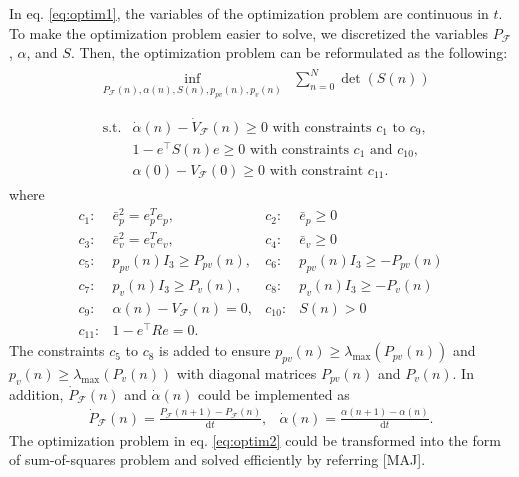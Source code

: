 \documentclass[letterpaper, 10 pt, conference]{ieeeconf}  %
\begin{document}
In eq. \eqref{eq:optim1}, the variables of the optimization problem are continuous in $t$. 
To make the optimization problem easier to solve, 
we discretized the variables $P_\mathcal{F}$, $\alpha$, and $S$. 
Then, the optimization problem can be reformulated as the following:
\begin{align}
&
\begin{array}{rl}
\displaystyle{\inf_{P_\mathcal{F}(n),\alpha(n),S(n),p_{pv}(n),p_v(n)}} & \displaystyle{\sum_{n=0}^{N}} \det(S(n))  \\
\end{array} \label{eq:optim2} \\
&
\begin{array}{rl}
\displaystyle{\text{s.t.}}& \dot{\alpha}(n) - \dot{V}_\mathcal{F}(n) \geq 0\text{ with constraints $c_1$ to $c_9$},  \\
& 1-e^\intercal S(n) e \geq 0\text{ with constraints $c_1$ and $c_{10}$}, \nonumber \\
& \alpha(0) - V_\mathcal{F}(0) \geq 0\text{ with constraint $c_{11}$}. \nonumber
\end{array} \nonumber 
\end{align}
where
\begin{equation}
\begin{array}{rlrl}
c_1:& \bar{e}_p^2 = e_p^Te_p,           & c_2:&\bar{e}_p \geq 0 \\
c_3:& \bar{e}_v^2 = e_v^Te_v,           & c_4:&\bar{e}_v \geq 0 \\
c_5:& p_{pv}(n)I_3 \geq P_{pv}(n),      & c_6:&p_{pv}(n)I_3 \geq -P_{pv}(n) \\
c_7:& p_{ v}(n)I_3 \geq P_{ v}(n),      & c_8:&p_{ v}(n)I_3 \geq -P_{ v}(n) \\
c_9:& \alpha(n) - V_\mathcal{F}(n) = 0, & c_{10}:&S(n) > 0 \\
c_{11}:& 1-e^\intercal R e = 0. &&
\end{array} \nonumber
\end{equation}
The constraints $c_5$ to $c_8$ is added to ensure $p_{pv}(n) \geq \lambda_{\max}(P_{pv}(n))$ and $p_v(n) \geq \lambda_{\max}(P_v(n))$ with diagonal matrices $P_{pv}(n)$ and $P_v(n)$.
In addition, $\dot{P}_\mathcal{F}(n)$ and $\dot{\alpha}(n)$ could be implemented as
\begin{equation}
\begin{array}{cc}
\dot{P}_\mathcal{F}(n) = \frac{P_\mathcal{F}(n+1) - P_\mathcal{F}(n)}{\text{d}t}, & \dot{\alpha}(n) = \frac{\alpha(n+1)-\alpha(n)}{\text{d}t}. 
\end{array} \nonumber
\end{equation}
The optimization problem in eq. \eqref{eq:optim2} could be transformed into the form of sum-of-squares problem and solved efficiently by referring [MAJ].
\end{document}
